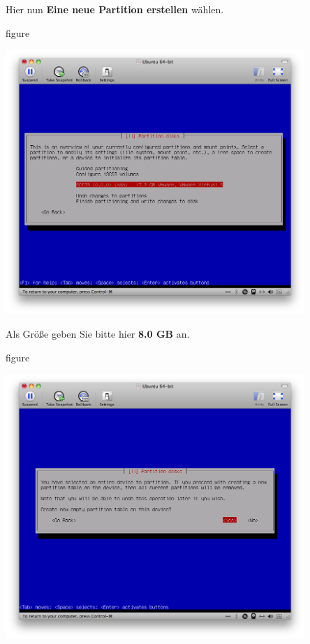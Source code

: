 Hier nun \textbf{Eine neue Partition erstellen} wählen.

\begin{nofloat}{figure}
\begin{center}
\includegraphics[width=0.85\textwidth]{screenshots/11_ubuntu_install.png}
\end{center}
\end{nofloat}

\pagebreak
Als Größe geben Sie bitte hier \textbf{8.0 GB} an.

\begin{nofloat}{figure}
\begin{center}
\includegraphics[width=0.85\textwidth]{screenshots/12_ubuntu_install.png}
\end{center}
\end{nofloat}

